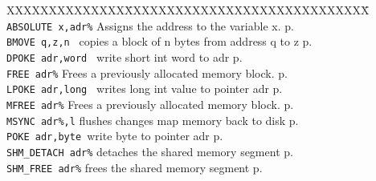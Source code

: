 \begin{tabbing}
XXXXXXXXXXXXXX\=XXXXXXXXXXXXXXXXXXXXXXXXXXXXX\=\kill\\

\verb|ABSOLUTE x,adr%| \> Assigns the address to the variable x.\> p.\pageref{ABSOLUTE}\\
{\tt BMOVE q,z,n	}\>	 copies a block of n bytes from address q to z\> p.\pageref{BMOVE}\\
{\tt DPOKE adr,word  	}\> write short int word to adr\> p.\pageref{DPOKE}\\
\verb|FREE adr%|          \> Frees a previously allocated memory block. \> p.\pageref{FREE}\\
{\tt LPOKE adr,long  	}\> writes long int value to pointer adr\> p.\pageref{LPOKE}\\
\verb|MFREE adr%|          \> Frees a previously allocated memory block. \> p.\pageref{MFREE}\\
\verb|MSYNC adr%,l| \>  flushes  changes map memory back to disk \> p.\pageref{MSYNC}\\
{\tt POKE adr,byte	}\>write byte to pointer adr\> p.\pageref{POKE}\\
\verb|SHM_DETACH adr%|   \> detaches the shared memory segment \> p.\pageref{SHMiDETACH}\\
\verb|SHM_FREE adr%|   \> frees the shared memory segment \> p.\pageref{SHMiFREE}\\
\end{tabbing}



